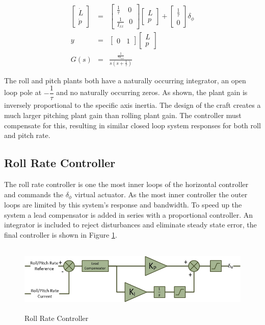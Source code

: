 \documentclass[12pt]{report}
\begin{document}
\begin{eqnarray}
\begin{bmatrix} \dot{L} \\ \dot{p}	\end{bmatrix}&=&\begin{bmatrix}\frac{1}{\tau}\ \ \ \ \ 0\\\frac{1}{I_{xx}} \ \ \ 0 \end{bmatrix} \begin{bmatrix} L \\ p \end{bmatrix} + \begin{bmatrix}\frac{1}{\tau}\\ 0 \end{bmatrix} \delta_\phi\label{EQ_RollStateSpace1}\\\label{EQ_RollStateSpace11} 
y &=& \begin{bmatrix} 0 \ \ \ \ 1 \end{bmatrix} \begin{bmatrix} L \\ p \end{bmatrix} \label{EQ_RollStateSpace2}\\
G(s) &=& \frac{\frac{1}{\tau I_{xx}}}{s (s + \frac{1}{\tau})}\label{EQ_RollTF}
\end{eqnarray}

The roll and pitch plants both have a naturally occurring integrator, an open loop pole at $-\dfrac{1}{\tau}$ and no naturally occurring zeros. As shown, the plant gain is inversely proportional to the specific axis inertia. The design of the craft creates a much larger pitching plant gain than rolling plant gain. The controller must compensate for this, resulting in similar closed loop system responses for both roll and pitch rate.

\subsection{Roll Rate Controller}
The roll rate controller is one the most inner loops of the horizontal controller and commands the $\delta_\phi$ virtual actuator. As the most inner controller the outer loops are limited by this system's response and bandwidth. To speed up the system a lead compensator is added in series with a proportional controller. An integrator is included to reject disturbances and eliminate steady state error, the final controller is shown in Figure \ref{IM_RollRateController}.

\begin{figure}[H]
	\centering
	\includegraphics[height = 3.3cm]{../References/Diagrams/RollRateController.jpg}
	\caption{Roll Rate Controller}
	\label{IM_RollRateController}
\end{figure}	
\end{document}
